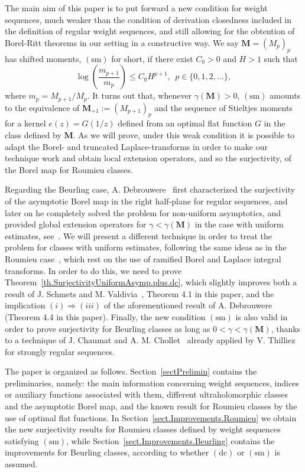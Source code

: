 \documentclass[11pt,a4paper]{article}
\theoremstyle{plain}
\theoremstyle{definition}
\numberwithin{equation}{section}
\newcommand{\M}{{\boldsymbol{M}}}
\def\ga{\gamma}
\newcommand{\dc}{\operatorname{(dc)}}
\newcommand{\sm}{\operatorname{(sm)}}
\begin{document}
The main aim of this paper is to put forward a new condition for weight sequences, much weaker than the condition of derivation closedness included in the definition of regular weight sequences, and still allowing for the obtention of Borel-Ritt theorems in our setting in a constructive way. We say $\M=(M_p)_p$ has shifted moments, $\sm$ for short, if there exist $C_0>0$ and $H>1$ such that $$
\log\left(\frac{m_{p+1}}{m_p}\right)\le C_0H^{p+1},\ \ p\in\{0,1,2,\dots\},
$$
where $m_p=M_{p+1}/M_p$. It turns out that, whenever $\ga(\M)>0$, $\sm$ amounts to the equivalence of $\M_{+1}:=(M_{p+1})_p$ and the sequence of Stieltjes moments for a kernel $e(z)=G(1/z)$ defined from an optimal flat function $G$ in the class defined by $\M$. As we will prove, under this weak condition it is possible to adapt the Borel- and truncated Laplace-transforms in order to make our technique work and obtain local extension operators, and so the surjectivity, of the Borel map for Roumieu classes.

Regarding the Beurling case, A. Debrouwere~\cite[Th. 7.4]{momentsdebrouwere} first characterized the surjectivity of the asymptotic Borel map in the right half-plane for regular sequences, and later on he completely solved the problem for non-uniform asymptotics, and provided  global extension operators for $\ga<\ga(\M)$ in the case with uniform estimates, see~\cite{DebrouwereBorelRittBeurlingClasses}. We will present a different technique in order to treat the problem for classes with uniform estimates, following the same ideas as in the Roumieu case~\cite{JimenezSanzSchindlSurjectDC}, which rest on the use of ramified Borel and Laplace integral transforms. In order to do this, we need to prove Theorem~\ref{th.SurjectivityUniformAsymp.plus.dc}, which slightly improves both a result of J. Schmets and M. Valdivia~\cite{SchmetsValdivia00}, Theorem 4.1 in this paper, and the implication $(i)\Rightarrow (iii)$ of the aforementioned result of A. Debrouwere (Theorem 4.4 in this paper).
Finally, the new condition $\sm$ is also valid in order to prove surjectivity for Beurling classes as long as $0<\ga<\ga(\M)$, thanks to a technique of J. Chaumat and A. M. Chollet~\cite{chaucho} already applied by V. Thilliez~\cite[Th. 3.4.1]{Thilliez03} for strongly regular sequences.


The paper is organized as follows. Section~\ref{sectPrelimin} contains the preliminaries, namely: the main information concerning weight sequences, indices or auxiliary functions associated with them, different ultraholomorphic classes and the asymptotic Borel map, and the known result for Roumieu classes by the use of optimal flat functions. In Section~\ref{sect.Improvements.Roumieu} we obtain the new surjectivity results for Roumieu classes defined by weight sequences satisfying $\sm$, while Section~\ref{sect.Improvements.Beurling} contains the improvements for Beurling classes, according to whether $\dc$ or $\sm$ is assumed.
\end{document}
